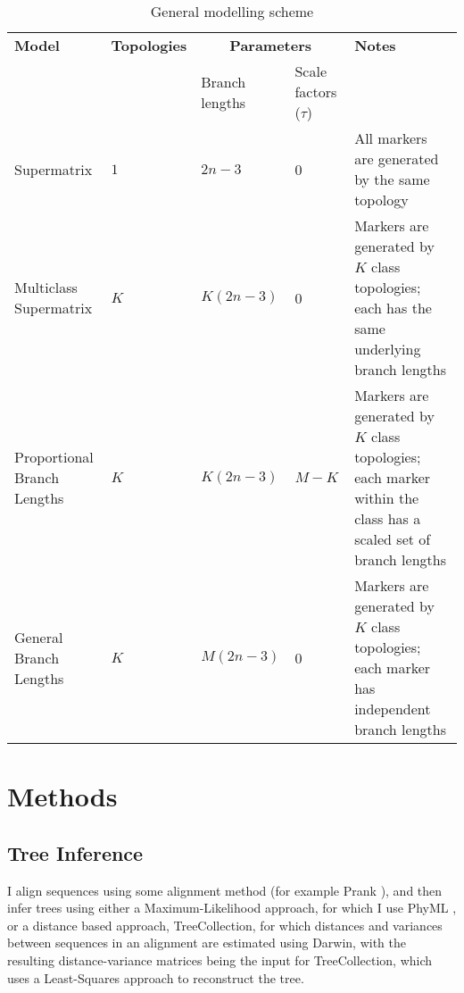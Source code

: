 \documentclass[11pt]{article}
\newcommand{\head}[1]{\textnormal{\textbf{#1}}}
\begin{document}
  \begin{table}[!htbp]
  \caption{General modelling scheme}\label{tab:table}
    \begin{tabu} to \linewidth {X[1.5,l]
                                X[0.5,c]
                                X[1,c]
                                X[1,c]
                                X[3,l]}
      \toprule[1.5pt]
      \head{Model} & \head{Topologies} & \multicolumn{2}{c}{\head{Parameters}} & \head{Notes}\\
        & & Branch lengths & Scale factors ($\tau$) & \\
      \midrule
      Supermatrix 	& $1$ & $2n-3$ &	0 & All markers are generated by the same topology\\ 
      Multiclass Supermatrix & $K$ & $K(2n-3)$ &	 0 & Markers are generated by $K$ class topologies; 
      each has the same underlying branch lengths\\ 
      Proportional Branch Lengths & $K$ & 	$K(2n-3)$ &	$M-K$ & Markers are generated by $K$ class topologies;
      each marker within the class has a scaled set of branch lengths \\ 
      General Branch Lengths & $K$ & $M(2n-3)$	& 0 & Markers are generated by $K$ class topologies;
      each marker has independent branch lengths\\ 
      \bottomrule[1.2pt]
    \end{tabu}
    \end{table}


\section{Methods}

\subsection{Tree Inference}
I align sequences using some alignment method (for example Prank \citep{Loytynoja:2005cb}), and then infer trees using either a Maximum-Likelihood approach, for which I use PhyML \citep{Guindon:2010gf}, or a distance based approach, TreeCollection, for which distances and variances between sequences in an alignment are estimated using Darwin, with the resulting distance-variance matrices being the input for TreeCollection, which uses a Least-Squares approach to reconstruct the tree.
\end{document}
